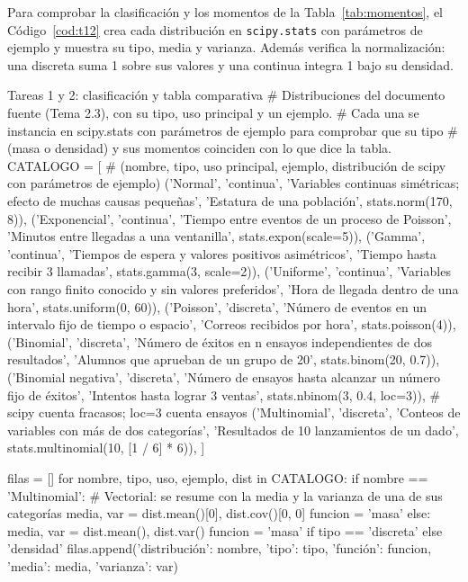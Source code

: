 \documentclass[11pt,letterpaper]{article}
\begin{document}
Para comprobar la clasificación y los momentos de la Tabla~\ref{tab:momentos}, el Código~\ref{cod:t12} crea cada distribución en \texttt{scipy.stats} con parámetros de ejemplo y muestra su tipo, media y varianza. Además verifica la normalización: una discreta suma 1 sobre sus valores y una continua integra 1 bajo su densidad.

\begin{codigo}[label=cod:t12]{Tareas 1 y 2: clasificación y tabla comparativa}
# Distribuciones del documento fuente (Tema 2.3), con su tipo, uso principal y un ejemplo.
# Cada una se instancia en scipy.stats con parámetros de ejemplo para comprobar que su tipo
# (masa o densidad) y sus momentos coinciden con lo que dice la tabla.
CATALOGO = [
    # (nombre, tipo, uso principal, ejemplo, distribución de scipy con parámetros de ejemplo)
    ('Normal', 'continua', 'Variables continuas simétricas; efecto de muchas causas pequeñas',
     'Estatura de una población', stats.norm(170, 8)),
    ('Exponencial', 'continua', 'Tiempo entre eventos de un proceso de Poisson',
     'Minutos entre llegadas a una ventanilla', stats.expon(scale=5)),
    ('Gamma', 'continua', 'Tiempos de espera y valores positivos asimétricos',
     'Tiempo hasta recibir 3 llamadas', stats.gamma(3, scale=2)),
    ('Uniforme', 'continua', 'Variables con rango finito conocido y sin valores preferidos',
     'Hora de llegada dentro de una hora', stats.uniform(0, 60)),
    ('Poisson', 'discreta', 'Número de eventos en un intervalo fijo de tiempo o espacio',
     'Correos recibidos por hora', stats.poisson(4)),
    ('Binomial', 'discreta', 'Número de éxitos en n ensayos independientes de dos resultados',
     'Alumnos que aprueban de un grupo de 20', stats.binom(20, 0.7)),
    ('Binomial negativa', 'discreta', 'Número de ensayos hasta alcanzar un número fijo de éxitos',
     'Intentos hasta lograr 3 ventas', stats.nbinom(3, 0.4, loc=3)),  # scipy cuenta fracasos; loc=3 cuenta ensayos
    ('Multinomial', 'discreta', 'Conteos de variables con más de dos categorías',
     'Resultados de 10 lanzamientos de un dado', stats.multinomial(10, [1 / 6] * 6)),
]

filas = []
for nombre, tipo, uso, ejemplo, dist in CATALOGO:
    if nombre == 'Multinomial':
        # Vectorial: se resume con la media y la varianza de una de sus categorías
        media, var = dist.mean()[0], dist.cov()[0, 0]
        funcion = 'masa'
    else:
        media, var = dist.mean(), dist.var()
        funcion = 'masa' if tipo == 'discreta' else 'densidad'
    filas.append({'distribución': nombre, 'tipo': tipo, 'función': funcion,
                  'media': media, 'varianza': var})


\end{codigo}
\end{document}
